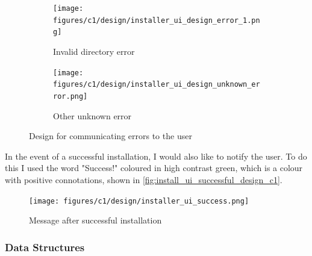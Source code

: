 \documentclass[11pt]{article}
\begin{document}
                \begin{figure}[!ht]
                    \begin{subfigure}{.5\textwidth}
                        \centering
                        \texttt{[image: figures/c1/design/installer\_ui\_design\_error\_1.png]}
                        \caption{Invalid directory error}
                        \label{fig:installer_ui_design_directory_error}
                    \end{subfigure}%
                    \begin{subfigure}{.5\textwidth}
                        \centering
                        \texttt{[image: figures/c1/design/installer\_ui\_design\_unknown\_error.png]}
                        \caption{Other unknown error}
                        \label{fig:installer_ui_design_other_error}
                    \end{subfigure}%
                    \caption{Design for communicating errors to the user}
                    \label{fig:installer_ui_design_errors_c1}
                \end{figure}

                In the event of a successful installation, I would also like to notify the user. To do this I used the word "Success!" coloured in high contrast green, which is a colour with positive connotations, shown in \autoref{fig:install_ui_successful_design_c1}.

                \begin{figure}[!ht]
                    \centering
                    \texttt{[image: figures/c1/design/installer\_ui\_success.png]}
                    \caption{Message after successful installation}
                    \label{fig:install_ui_successful_design_c1}
                \end{figure}
                

            \subsubsection{Data Structures}
\end{document}
